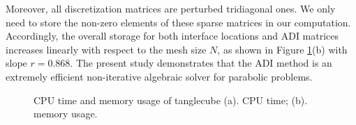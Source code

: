 \documentclass[dissertation]{uathesis}
\begin{document}
\begin{body}
Moreover, all discretization matrices are perturbed tridiagonal ones. We only need to store the non-zero elements
of these sparse matrices in our computation. 
Accordingly, the overall storage for both interface locations and ADI matrices increases linearly
with respect to the mesh size $N$, as shown in Figure \ref{fig:CPU_Memory_tanglecube}(b) with slope $r=0.868$. 
The present study demonstrates that the ADI method is an extremely efficient non-iterative algebraic solver for parabolic problems.

\begin{figure}[!ht]	
	\begin{center}
	\end{center}
	\caption{CPU time and memory usage of tanglecube (a). CPU time; (b). memory usage.}
	\label{fig:CPU_Memory_tanglecube}
\end{figure}



\end{body}
\end{document}
